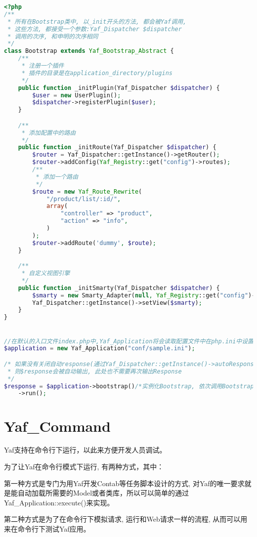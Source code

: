 \begin{lstlisting}[language=PHP]
<?php
/**
 * 所有在Bootstrap类中, 以_init开头的方法, 都会被Yaf调用,
 * 这些方法, 都接受一个参数:Yaf_Dispatcher $dispatcher
 * 调用的次序, 和申明的次序相同
 */
class Bootstrap extends Yaf_Bootstrap_Abstract {
    /**
     * 注册一个插件
     * 插件的目录是在application_directory/plugins
     */
    public function _initPlugin(Yaf_Dispatcher $dispatcher) {
        $user = new UserPlugin();
        $dispatcher->registerPlugin($user);
    }

    /**
     * 添加配置中的路由
     */
    public function _initRoute(Yaf_Dispatcher $dispatcher) {
        $router = Yaf_Dispatcher::getInstance()->getRouter();
        $router->addConfig(Yaf_Registry::get("config")->routes);
        /**
         * 添加一个路由
         */
        $route = new Yaf_Route_Rewrite(
            "/product/list/:id/",
            array(
                "controller" => "product",
                "action" => "info",
            )
        );
        $router->addRoute('dummy', $route);
    }

    /**
     * 自定义视图引擎
     */
    public function _initSmarty(Yaf_Dispatcher $dispatcher) {
        $smarty = new Smarty_Adapter(null, Yaf_Registry::get("config")->get("smarty"));
        Yaf_Dispatcher::getInstance()->setView($smarty);
    }
}


//在默认的入口文件index.php中,Yaf_Application将会读取配置文件中在php.ini中设置的application.environ的配置节
$application = new Yaf_Application("conf/sample.ini");

/* 如果没有关闭自动response(通过Yaf_Dispatcher::getInstance()->autoResponse(FALSE)),
 * 则$response会被自动输出, 此处也不需要再次输出Response
 */
$response = $application->bootstrap()/*实例化Bootstrap, 依次调用Bootstrap中所有_init开头的方法*/
    ->run();
\end{lstlisting}

\chapter{Yaf\_Command}

Yaf支持在命令行下运行，以此来方便开发人员调试。

为了让Yaf在命令行模式下运行, 有两种方式，其中：

第一种方式是专门为用Yaf开发Contab等任务脚本设计的方式, 对Yaf的唯一要求就是能自动加载所需要的Model或者类库，所以可以简单的通过Yaf\_Application::execute()来实现。

第二种方式是为了在命令行下模拟请求, 运行和Web请求一样的流程, 从而可以用来在命令行下测试Yaf应用。

